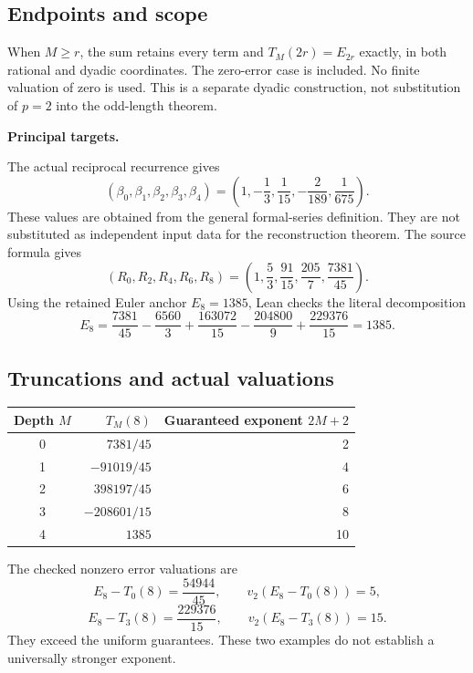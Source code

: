 \subsection*{Endpoints and scope}
When $M\geq r$, the sum retains every term and $T_M(2r)=E_{2r}$ exactly, in both rational and dyadic coordinates. The zero-error case is included. No finite valuation of zero is used. This is a separate dyadic construction, not substitution of $p=2$ into the odd-length theorem.

\textbf{Principal targets.}\par
{}\par
{}\par
{}
\par\medskip
{}
The actual reciprocal recurrence gives
\[
 (\beta_0,\beta_1,\beta_2,\beta_3,\beta_4)
 =\left(1,-\frac13,\frac1{15},-\frac2{189},\frac1{675}\right).
\]
These values are obtained from the general formal-series definition. They are not substituted as independent input data for the reconstruction theorem. The source formula gives
\[
 (R_0,R_2,R_4,R_6,R_8)
 =\left(1,\frac53,\frac{91}{15},\frac{205}{7},\frac{7381}{45}\right).
\]
Using the retained Euler anchor $E_8=1385$, Lean checks the literal decomposition
\[
 E_8=\frac{7381}{45}-\frac{6560}{3}+\frac{163072}{15}
       -\frac{204800}{9}+\frac{229376}{15}=1385.
\]

\subsection*{Truncations and actual valuations}
\begin{center}
\begin{tabular}{@{}crr@{}}
\toprule
Depth $M$ & $T_M(8)$ & Guaranteed exponent $2M+2$\\\midrule
0 & $7381/45$ & 2\\[3pt]
1 & $-91019/45$ & 4\\[3pt]
2 & $398197/45$ & 6\\[3pt]
3 & $-208601/15$ & 8\\[3pt]
4 & $1385$ & 10\\\bottomrule
\end{tabular}
\end{center}
The checked nonzero error valuations are
\[
 E_8-T_0(8)=\frac{54944}{45},\qquad v_2(E_8-T_0(8))=5,
\]
\[
 E_8-T_3(8)=\frac{229376}{15},\qquad v_2(E_8-T_3(8))=15.
\]
They exceed the uniform guarantees. These two examples do not establish a universally stronger exponent.

